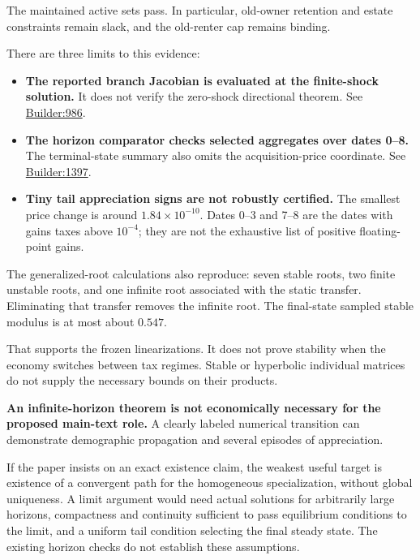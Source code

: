 \documentclass[11pt,letterpaper]{article}
\providecommand{\tightlist}{\setlength{\itemsep}{0.25em}\setlength{\parskip}{0pt}}
\begin{document}
\endgroup

The maintained active sets pass. In particular, old-owner retention and estate constraints
remain slack, and the old-renter cap remains binding.

There are three limits to this evidence:

\begin{itemize}
\tightlist
\item
  \textbf{The reported branch Jacobian is evaluated at the finite-shock solution.} It does
  not verify the zero-shock directional theorem. See
  \hyperlink{source-builder}{Builder:986}.
\item
  \textbf{The horizon comparator checks selected aggregates over dates 0--8.} The
  terminal-state summary also omits the acquisition-price coordinate. See
  \hyperlink{source-builder}{Builder:1397}.
\item
  \textbf{Tiny tail appreciation signs are not robustly certified.} The smallest price
  change is around \(1.84\times10^{-10}\). Dates 0--3 and 7--8 are the dates with gains
  taxes above \(10^{-4}\); they are not the exhaustive list of positive floating-point
  gains.
\end{itemize}

The generalized-root calculations also reproduce: seven stable roots, two finite unstable
roots, and one infinite root associated with the static transfer. Eliminating that
transfer removes the infinite root. The final-state sampled stable modulus is at most
about \(0.547\).

That supports the frozen linearizations. It does not prove stability when the economy
switches between tax regimes. Stable or hyperbolic individual matrices do not supply the
necessary bounds on their products.

\textbf{An infinite-horizon theorem is not economically necessary for the proposed
main-text role.} A clearly labeled numerical transition can demonstrate demographic
propagation and several episodes of appreciation.

If the paper insists on an exact existence claim, the weakest useful target is existence
of a convergent path for the homogeneous specialization, without global uniqueness. A
limit argument would need actual solutions for arbitrarily large horizons, compactness and
continuity sufficient to pass equilibrium conditions to the limit, and a uniform tail
condition selecting the final steady state. The existing horizon checks do not establish
these assumptions.
\end{document}
